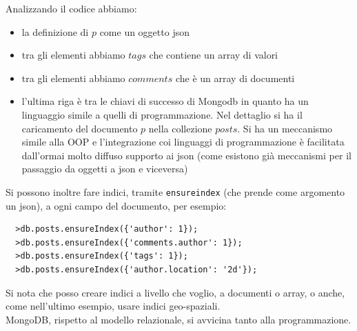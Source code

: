 \documentclass[a4paper,12pt, oneside]{book}
\begin{document}
Analizzando il codice abbiamo:
\begin{itemize}
  \item la definizione di $p$ come un oggetto json
  \item tra gli elementi abbiamo $tags$ che contiene un array di valori
  \item tra gli elementi abbiamo $comments$ che è un array di documenti
  \item l'ultima riga è tra le chiavi di successo di Mongodb in quanto ha un
  linguaggio simile a quelli di programmazione. Nel dettaglio si ha il
  caricamento del documento $p$ nella collezione $posts$. Si ha un meccanismo
  simile alla OOP e l'integrazione coi linguaggi di programmazione è facilitata
  dall'ormai molto diffuso supporto ai json (come esistono già meccanismi per il
  passaggio da oggetti a json e viceversa)
\end{itemize}
Si possono inoltre fare indici, tramite \texttt{ensureindex} (che prende come
argomento un json), a ogni campo del
documento, per esempio: 
\begin{verbatim}
  >db.posts.ensureIndex({'author': 1});
  >db.posts.ensureIndex({'comments.author': 1});
  >db.posts.ensureIndex({'tags': 1});
  >db.posts.ensureIndex({'author.location': '2d'});
\end{verbatim}
Si nota che posso creare indici a livello che voglio, a documenti o array, o
anche, come nell'ultimo esempio, usare indici geo-spaziali.\\
MongoDB, rispetto al modello relazionale, si avvicina tanto alla
programmazione.\\
\end{document}
